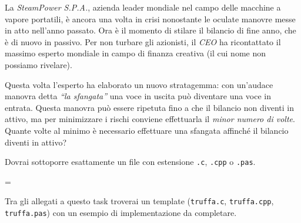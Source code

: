 \usepackage{xcolor}
\usepackage{afterpage}
\usepackage{pifont,mdframed}
\usepackage[bottom]{footmisc}

\makeatletter
\gdef\this@inputfilename{input.txt}
\gdef\this@outputfilename{output.txt}
\makeatother

\newcommand{\inputfile}{\texttt{input.txt}}
\newcommand{\outputfile}{\texttt{output.txt}}

\newenvironment{warning}
  {\par\begin{mdframed}[linewidth=2pt,linecolor=gray]%
    \begin{list}{}{\leftmargin=1cm
                   \labelwidth=\leftmargin}\item[\Large\ding{43}]}
  {\end{list}\end{mdframed}\par}

	La \emph{SteamPower S.P.A.}, azienda leader mondiale nel campo delle macchine a vapore portatili, è ancora una volta in crisi nonostante le oculate manovre messe in atto nell'anno passato. Ora è il momento di stilare il bilancio di fine anno, che è di nuovo in passivo. Per non turbare gli azionisti, il \emph{CEO} ha ricontattato il massimo esperto mondiale in campo di finanza creativa (il cui nome non possiamo rivelare).

	Questa volta l'esperto ha elaborato un nuovo stratagemma: con un'audace manovra detta \emph{``la sfangata''} una voce in uscita può diventare una voce in entrata. Questa manovra può essere ripetuta fino a che il bilancio non diventi in attivo, ma per minimizzare i rischi conviene effettuarla il \emph{minor numero di volte}. Quante volte al minimo è necessario effettuare una sfangata affinché il bilancio diventi in attivo?

\Implementation
Dovrai sottoporre esattamente un file con estensione \texttt{.c}, \texttt{.cpp} o \texttt{.pas}.

\begin{warning}
Tra gli allegati a questo task troverai un template (\texttt{truffa.c}, \texttt{truffa.cpp}, \texttt{truffa.pas}) con un esempio di implementazione da completare.
\end{warning}

